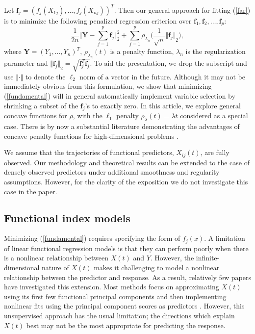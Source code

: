 \documentclass[aos,MSNbibl,dvips]{arximspdf}
\newcommand{\rrVert}{\Vert}
\newcommand{\llVert}{\Vert}
\newcommand{\bY}{{\mathbf Y}}
\newcommand{\bff}{{\mathbf f}}
\begin{document}
Let $\bff_j= (f_j(X_{1j}),\ldots,f_j(X_{nj}) )^T$. Then
our general approach for fitting (\ref{far}) is to minimize the
following penalized regression criterion over $\bff_1, \bff_2,\ldots,
\bff_p$:
%
\begin{equation}
\label{fundamental} \frac{1}{2n} \Biggl\llVert\bY-\sum
_{j=1}^p \bff_j \Biggr\rrVert
^2_2 + \sum_{j=1}^p
\rho_{\lambda_n} \biggl(\frac{1}{\sqrt{n}}{\llVert\bff_j\rrVert
}_2 \biggr),
\end{equation}
%
where $\bY=(Y_1,\ldots, Y_n)^T$, $\rho_{\lambda_n}(t)$ is a penalty
function, $\lambda_n$ is the regularization parameter and ${\llVert
\bff_j\rrVert
}_2=\sqrt{\bff_j^T\bff_j}$. To aid the presentation, we drop the
subscript and use $\llVert \cdot\rrVert $ to denote the $\ell_2$ norm
of a vector
in the future. Although it may not be immediately obvious from this
formulation, we show that minimizing (\ref{fundamental}) will in
general automatically implement variable selection by shrinking a
subset of the $\bff_j$'s to exactly zero. In this article, we explore
general concave functions for $\rho$, with the $\ell_1$ penalty $\rho
_{\lambda}(t) = \lambda t$ considered as a special case. There is by
now a substantial literature demonstrating the
advantages of concave penalty functions for high-dimensional problems
\cite{fan2,fan3,lv1,fan5,loh13}.

We assume that the trajectories of functional predictors, $X_{ij}(t)$,
are fully observed. Our methodology and theoretical results can be
extended to the case of densely observed predictors under additional
smoothness and regularity assumptions. However, for the clarity of the
exposition we do not investigate this case in the paper.


\subsection{Functional index models}
\label{funcindecsec}

Minimizing (\ref{fundamental}) requires specifying the form of
$f_j(x)$. A limitation of linear functional regression models is that
they can
perform poorly when there is a nonlinear relationship between $X(t)$ and
$Y$. However, the infinite-dimensional nature of $X(t)$ makes it
challenging to model a nonlinear relationship between the predictor and
response. As a result, relatively few papers have investigated
this extension. Most methods focus on approximating $X(t)$ using its first
few functional principal components and then implementing nonlinear fits
using the principal component scores as predictors \cite{muller2}. However,
this unsupervised approach has the usual limitation; the directions which
explain $X(t)$ best may not be the most appropriate for predicting the
response.
\end{document}
